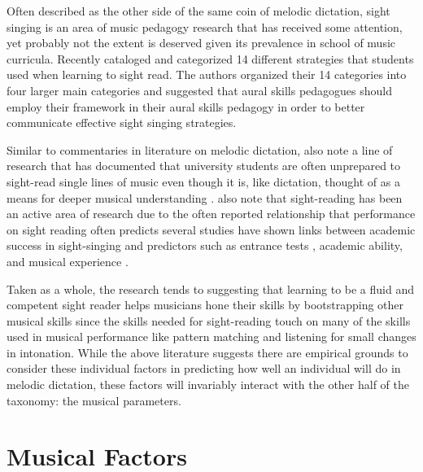 \documentclass[]{book}
\begin{document}
Often described as the other side of the same coin of melodic dictation, sight singing is an area of music pedagogy research that has received some attention, yet probably not the extent is deserved given its prevalence in school of music curricula.
Recently \citet{fournierCognitiveStrategiesSightsinging2017a} cataloged and categorized 14 different strategies that students used when learning to sight read.
The authors organized their 14 categories into four larger main categories and suggested that aural skills pedagogues should employ their framework in their aural skills pedagogy in order to better communicate effective sight singing strategies.

Similar to commentaries in literature on melodic dictation, \citet{fournierCognitiveStrategiesSightsinging2017a} also note a line of research that has documented that university students are often unprepared to sight-read single lines of music \citep{asmusMusicTeachingMusic2004, thompsonPitchInternalizationStrategies2003} even though it is, like dictation, thought of as a means for deeper musical understanding \citep{karpinskiAuralSkillsAcquisition2000, rogersTeachingApproachesMusic2004}.
\citet{fournierCognitiveStrategiesSightsinging2017a} also note that sight-reading has been an active area of research due to the often reported relationship that performance on sight reading often predicts several studies have shown links between academic success in sight-singing and predictors such as entrance tests \citep{harrisonValidityMusicalAptitude1987}, academic ability, and musical experience \citep{harrisonEffectsMusicalAptitude1994}.

Taken as a whole, the research tends to suggesting that learning to be a fluid and competent sight reader helps musicians hone their skills by bootstrapping other musical skills since the skills needed for sight-reading touch on many of the skills used in musical performance like pattern matching and listening for small changes in intonation.
While the above literature suggests there are empirical grounds to consider these individual factors in predicting how well an individual will do in melodic dictation, these factors will invariably interact with the other half of the taxonomy: the musical parameters.

\hypertarget{musical-factors}{%
\section{Musical Factors}\label{musical-factors}}
\end{document}
